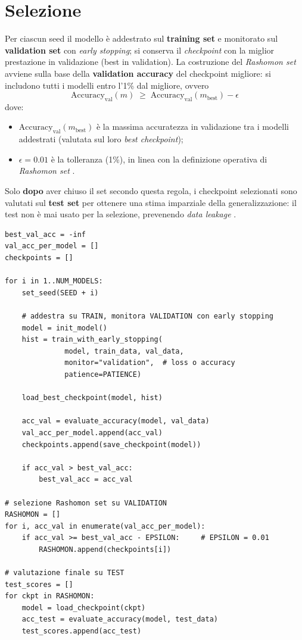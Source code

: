 \documentclass[12pt,a4paper,oneside]{report}
\numberwithin{figure}{chapter}
\numberwithin{table}{chapter}
\begin{document}
\section{Selezione}
Per ciascun seed il modello è addestrato sul \textbf{training set} e monitorato
sul \textbf{validation set} con \emph{early stopping}; si conserva il
\emph{checkpoint} con la miglior prestazione in validazione (best in
validation). La costruzione del \emph{Rashomon set} avviene sulla base della
\textbf{validation accuracy} del checkpoint migliore: si includono tutti i
modelli entro l’1\% dal migliore, ovvero
\[
      \mathrm{Accuracy}_{\mathrm{val}}(m) \;\ge\;
      \mathrm{Accuracy}_{\mathrm{val}}(m_{\mathrm{best}}) - \epsilon
\]
dove:
\begin{itemize}
      \item $\mathrm{Accuracy}_{\mathrm{val}}(m_{\mathrm{best}})$ è la massima accuratezza in validazione
            tra i modelli addestrati (valutata sul loro \emph{best checkpoint});
      \item $\epsilon = 0{.}01$ è la tolleranza (1\%), in linea con la definizione operativa di
            \emph{Rashomon set} \citep{fisher2019all}.
\end{itemize}

Solo \textbf{dopo} aver chiuso il set secondo questa regola, i checkpoint
selezionati sono valutati sul \textbf{test set} per ottenere una stima
imparziale della generalizzazione: il test non è mai usato per la selezione,
prevenendo \emph{data leakage}
\citep{leventi2023consistency,mueller2023rashomon}.

\begin{lstlisting}[caption={Training con early stopping, selezione su validation ed evaluation su test}, label={lst:rashomon_training}]
best_val_acc = -inf
val_acc_per_model = []
checkpoints = []

for i in 1..NUM_MODELS:
    set_seed(SEED + i)

    # addestra su TRAIN, monitora VALIDATION con early stopping
    model = init_model()
    hist = train_with_early_stopping(
              model, train_data, val_data,
              monitor="validation",  # loss o accuracy
              patience=PATIENCE)

    load_best_checkpoint(model, hist)

    acc_val = evaluate_accuracy(model, val_data)
    val_acc_per_model.append(acc_val)
    checkpoints.append(save_checkpoint(model))

    if acc_val > best_val_acc:
        best_val_acc = acc_val

# selezione Rashomon set su VALIDATION
RASHOMON = []
for i, acc_val in enumerate(val_acc_per_model):
    if acc_val >= best_val_acc - EPSILON:     # EPSILON = 0.01
        RASHOMON.append(checkpoints[i])

# valutazione finale su TEST 
test_scores = []
for ckpt in RASHOMON:
    model = load_checkpoint(ckpt)
    acc_test = evaluate_accuracy(model, test_data)
    test_scores.append(acc_test)
\end{lstlisting}
\end{document}
